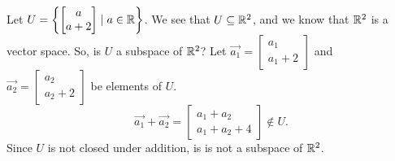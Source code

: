 \begin{example}
	Let $U = \left\{\begin{bmatrix}a \\ a+2 \end{bmatrix} \mid a \in \mathbb{R}\right\}$.
	We see that $U \subseteq \mathbb{R}^2$, and we know that $\mathbb{R}^2$ is a vector space.
	So, is $U$ a subspace of $\mathbb{R}^2$?
	Let $\vec{a_1} = \begin{bmatrix}a_1 \\ a_1 + 2\end{bmatrix}$ and $\vec{a_2} = \begin{bmatrix} a_2 \\ a_2 + 2 \end{bmatrix}$ be elements of $U$.
	\begin{equation*}
		\vec{a_1} + \vec{a_2} = \begin{bmatrix}
			a_1 + a_2 \\ a_1 + a_2 + 4
		\end{bmatrix} \not\in U.
	\end{equation*}
	Since $U$ is not closed under addition, is is not a subspace of $\mathbb{R}^2$.
\end{example}